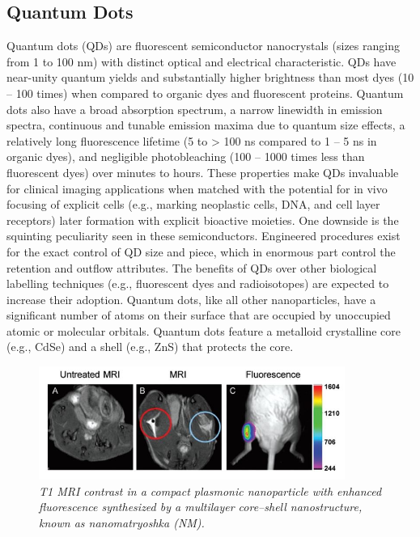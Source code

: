 \documentclass[12pt]{article}
\begin{document}
\subsection*{Quantum Dots}
Quantum dots (QDs) are fluorescent semiconductor nanocrystals (sizes ranging from 1 to 100 nm) with distinct optical and electrical characteristic. QDs have near-unity quantum yields and substantially higher brightness than most dyes (10 – 100 times) when compared to organic dyes and fluorescent proteins. Quantum dots also have a broad absorption spectrum, a narrow linewidth in emission spectra, continuous and tunable emission maxima due to quantum size effects, a relatively long fluorescence lifetime (5 to > 100 ns compared to 1 – 5 ns in organic dyes), and negligible photobleaching (100 – 1000 times less than fluorescent dyes) over minutes to hours. These properties make QDs invaluable for clinical imaging applications when matched with the potential for in vivo focusing of explicit cells (e.g., marking neoplastic cells, DNA, and cell layer receptors) later formation with explicit bioactive moieties. One downside is the squinting peculiarity seen in these semiconductors. Engineered procedures exist for the exact control of QD size and piece, which in enormous part control the retention and outflow attributes. The benefits of QDs over other biological labelling techniques (e.g., fluorescent dyes and radioisotopes) are expected to increase their adoption. Quantum dots, like all other nanoparticles, have a significant number of atoms on their surface that are occupied by unoccupied atomic or molecular orbitals. Quantum dots feature a metalloid crystalline core (e.g., CdSe) and a shell (e.g., ZnS) that protects the core.
\begin{figure}[htp]
    \centering
    \includegraphics[width=10cm]{4.jpg}
    \caption{\textit{T1 MRI contrast in a compact plasmonic nanoparticle
with enhanced fluorescence synthesized by a multilayer core–shell
nanostructure, known as nanomatryoshka (NM).}}
    \label{Fig:2}
\end{figure}
\end{document}
